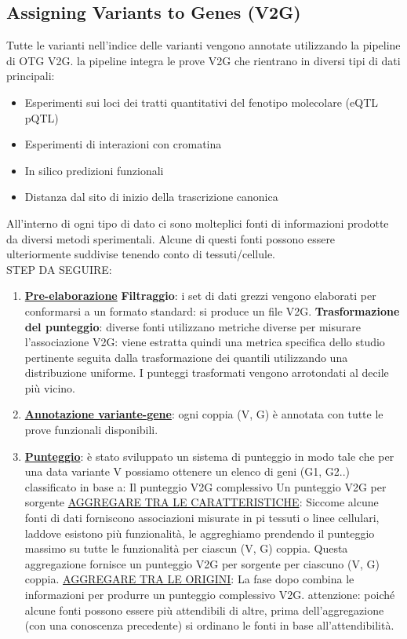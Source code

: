 \documentclass{article}
\begin{document}
\subsection{Assigning Variants to Genes (V2G)}
Tutte le varianti nell'indice delle varianti vengono annotate utilizzando la pipeline di OTG V2G. la pipeline integra le prove V2G che rientrano in diversi tipi di dati principali:
\begin{itemize}
    \item Esperimenti sui loci dei tratti quantitativi del fenotipo molecolare (eQTL pQTL)
    \item Esperimenti di interazioni con cromatina
    \item In silico predizioni funzionali
    \item Distanza dal sito di inizio della trascrizione canonica
\end{itemize} 
All'interno di ogni tipo di dato ci sono molteplici fonti di informazioni prodotte da diversi metodi sperimentali.
Alcune di questi fonti possono essere ulteriormente suddivise tenendo conto di tessuti/cellule.\\
STEP DA SEGUIRE:
\begin{enumerate}
    \item \underline{\textbf{Pre-elaborazione}}
         \textbf{Filtraggio}: i set di dati grezzi vengono elaborati per conformarsi a un formato standard: si produce un file V2G.
         \textbf{Trasformazione del punteggio}: diverse fonti utilizzano metriche diverse per misurare l'associazione V2G: viene estratta quindi una metrica specifica dello studio pertinente seguita dalla trasformazione dei quantili utilizzando una distribuzione uniforme. I punteggi trasformati vengono arrotondati al decile più vicino.
    \item \underline{\textbf{Annotazione variante-gene}}: ogni coppia (V, G) è annotata con tutte le prove funzionali disponibili.
    \item \underline{\textbf{Punteggio}}: è stato sviluppato un sistema di punteggio in modo tale che per una data variante V possiamo ottenere un elenco di geni (G1, G2..) classificato in base a:
             Il punteggio V2G complessivo
             Un punteggio V2G per sorgente
         \underline{AGGREGARE TRA LE CARATTERISTICHE}: Siccome alcune fonti di dati forniscono associazioni misurate in pi tessuti o linee cellulari, laddove esistono più funzionalità, le aggreghiamo prendendo il punteggio massimo su tutte le funzionalità per ciascun (V, G) coppia. Questa aggregazione fornisce un punteggio V2G per sorgente per ciascuno (V, G) coppia.
         \underline{AGGREGARE TRA LE ORIGINI}: La fase dopo combina le informazioni per produrre un punteggio complessivo V2G. attenzione: poiché alcune fonti possono essere più attendibili di altre, prima dell'aggregazione (con una conoscenza precedente) si ordinano le fonti in base all'attendibilità.
\end{enumerate}
\end{document}
